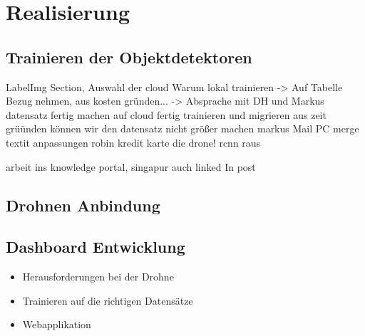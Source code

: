 \chapter{Realisierung}

\section{Trainieren der Objektdetektoren}

LabelImg Section, Auswahl der cloud
Warum lokal trainieren -> Auf Tabelle Bezug nehmen, aus kosten gründen... -> Absprache mit DH und Markus
datensatz fertig machen
auf cloud fertig trainieren und migrieren
aus zeit grüünden können wir den datensatz nicht größer machen
markus Mail
PC merge
textit anpassungen
robin kredit karte
die drone!
rcnn raus

arbeit ins knowledge portal, singapur auch
linked In post

\section{Drohnen Anbindung}

\section{Dashboard Entwicklung}

\begin{itemize}
	\item Herausforderungen bei der Drohne
	\item Trainieren auf die richtigen Datensätze
	\item Webapplikation
\end{itemize}
